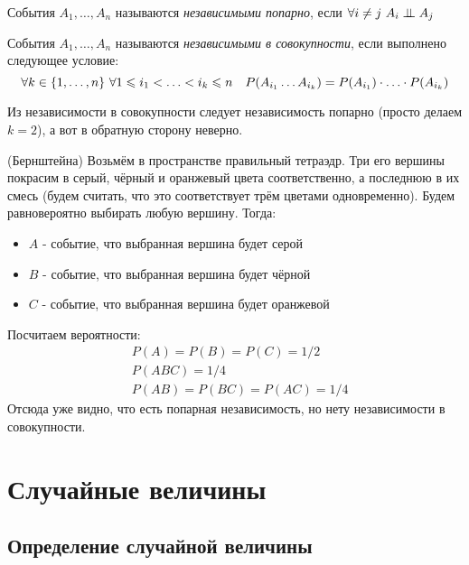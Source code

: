 \begin{definition}
	События $A_1, \ldots, A_n$ называются \textit{независимыми попарно}, если $\forall i \neq j\ A_i \perp\mkern-9.5mu\perp A_j$
\end{definition}

\begin{definition}
	События $A_1, \ldots, A_n$ называются \textit{независимыми в совокупности}, если выполнено следующее условие:
	\[
		\forall k \in \{1, \ldots, n\}\ \forall 1 \leqslant i_1 < \ldots < i_k \leqslant n \quad P(A_{i_1} \ldots A_{i_k}) = P(A_{i_1}) \cdot \ldots \cdot P(A_{i_k})
	\]
\end{definition}

\begin{note}
	Из независимости в совокупности следует независимость попарно (просто делаем $k = 2$), а вот в обратную сторону неверно.
\end{note}

\begin{example} (Бернштейна)
	Возьмём в пространстве правильный тетраэдр. Три его вершины покрасим в серый, чёрный и оранжевый цвета соответственно, а последнюю в их смесь (будем считать, что это соответствует трём цветами одновременно). Будем равновероятно выбирать любую вершину. Тогда:
	\begin{itemize}
		\item $A$ - событие, что выбранная вершина будет серой
		
		\item $B$ - событие, что выбранная вершина будет чёрной
		
		\item $C$ - событие, что выбранная вершина будет оранжевой
	\end{itemize}
	Посчитаем вероятности:
	\begin{align*}
		&{P(A) = P(B) = P(C) = 1 / 2}
		\\
		&{P(ABC) = 1 / 4}
		\\
		&{P(AB) = P(BC) = P(AC) = 1 / 4}
	\end{align*}
	Отсюда уже видно, что есть попарная независимость, но нету независимости в совокупности.
\end{example}

\section{Случайные величины}

\subsection{Определение случайной величины}

